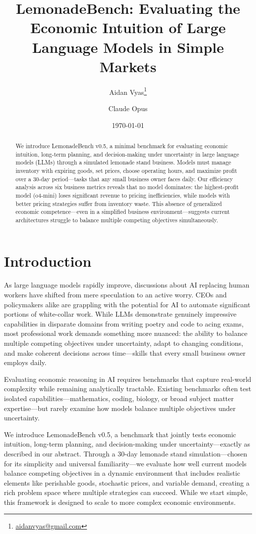 \documentclass[11pt]{article}
\title{LemonadeBench: Evaluating the Economic Intuition of Large Language Models in Simple Markets}
\author{
    Aidan Vyas\footnote{\href{mailto:aidanvyas@gmail.com}{aidanvyas@gmail.com}}
    \and
    Claude Opus
}
\date{\today}
\begin{document}
\maketitle

\begin{abstract}
We introduce LemonadeBench v0.5, a minimal benchmark for evaluating economic intuition, long-term planning, and decision-making under uncertainty in large language models (LLMs) through a simulated lemonade stand business. 
Models must manage inventory with expiring goods, set prices, choose operating hours, and maximize profit over a 30-day period—tasks that any small business owner faces daily. 
Our efficiency analysis across six business metrics reveals that no model dominates: the highest-profit model (o4-mini) loses significant revenue to pricing inefficiencies, while models with better pricing strategies suffer from inventory waste. 
This absence of generalized economic competence—even in a simplified business environment—suggests current architectures struggle to balance multiple competing objectives simultaneously.
\end{abstract}

\section{Introduction}

As large language models rapidly improve, discussions about AI replacing human workers have shifted from mere speculation to an active worry. CEOs and policymakers alike are grappling with the potential for AI to automate significant portions of white-collar work. While LLMs demonstrate genuinely impressive capabilities in disparate domains from writing poetry and code to acing exams, most professional work demands something more nuanced: the ability to balance multiple competing objectives under uncertainty, adapt to changing conditions, and make coherent decisions across time—skills that every small business owner employs daily.

Evaluating economic reasoning in AI requires benchmarks that capture real-world complexity while remaining analytically tractable. Existing benchmarks often test isolated capabilities—mathematics, coding, biology, or broad subject matter expertise—but rarely examine how models balance multiple objectives under uncertainty.

We introduce LemonadeBench v0.5, a benchmark that jointly tests economic intuition, long-term planning, and decision-making under uncertainty—exactly as described in our abstract. Through a 30-day lemonade stand simulation—chosen for its simplicity and universal familiarity—we evaluate how well current models balance competing objectives in a dynamic environment that includes realistic elements like perishable goods, stochastic prices, and variable demand, creating a rich problem space where multiple strategies can succeed. While we start simple, this framework is designed to scale to more complex economic environments.
\end{document}
